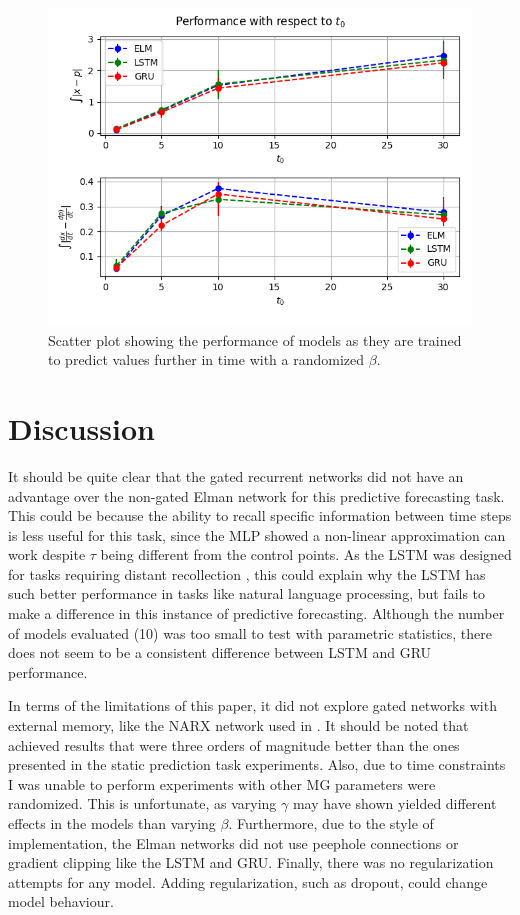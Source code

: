 \documentclass[11pt]{article}
\begin{document}
  \begin{figure}
    \begin{center}
   \includegraphics[width=.96\textwidth]{figures/mg2_save.png}      
    \caption{Scatter plot showing the performance of models  as they are trained to predict values further
      in time with a randomized $\beta$.}
    \label{fig:mg2_save}
    \end{center}
  \end{figure}

\section {Discussion}
It should be quite clear that the gated recurrent networks did not have
an advantage over the non-gated Elman network for this predictive
forecasting task. This could be because the ability to recall specific 
information between time steps is less useful for this task, since the
MLP showed a non-linear approximation can work despite $\tau$ being
different from the control points. As the LSTM was designed for tasks requiring distant recollection
\cite{LSTM}, this could explain why the LSTM has such better
performance in tasks like natural language processing, but fails to make a difference in this
instance of predictive forecasting. Although the number of models
evaluated (10) was too small to test with parametric statistics, there
does not seem to be a consistent difference between LSTM and GRU performance.

In terms of the limitations of this paper, it did not explore gated
networks with external memory, like the NARX network used in
\cite{Farsa}. It should be noted that \cite{Farsa} achieved results
that were three orders of magnitude better than the ones presented in the static
prediction task experiments. Also, due to
time constraints I was unable to perform experiments with other MG
parameters were randomized. This is unfortunate, as varying $\gamma$
may have shown yielded different effects in the models than varying $\beta$. Furthermore, due to
the style of implementation, the Elman networks did not use peephole
connections or gradient clipping like the LSTM and GRU. Finally, there
was no regularization attempts for any model. Adding regularization, such as dropout, could change model behaviour.
\end{document}
